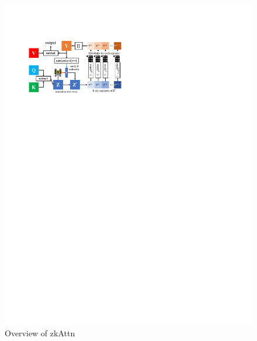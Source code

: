 \documentclass[lang=en]{sjtuarticle}
\begin{document}
\begin{figure}[h]
    \centering
    \begin{minipage}{.4\textwidth}
        \centering
        \includegraphics[width=\textwidth]{zkattn.pdf}
        \caption{Overview of \textsf{zkAttn}}
        \label{fig:zkattn}
    \end{minipage}\hfill
    \begin{minipage}{.55\textwidth}
        \centering

\end{minipage}
\end{figure}
\end{document}
